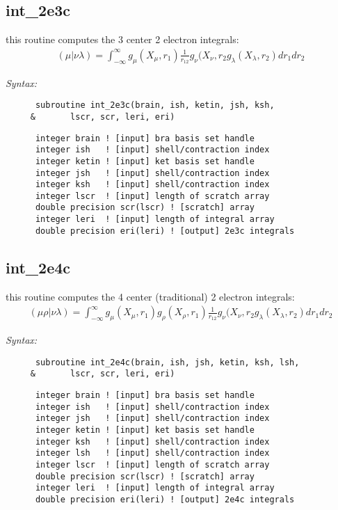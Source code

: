 \subsection{int\_2e3c} 
this routine computes the 3 center 2 electron integrals:  
\begin{eqnarray*} 
({\mu}|{\nu}{\lambda}) = \int_{-\infty}^{\infty} g_{\mu}(X_{\mu},r_{1})\frac{1}{r_{12}} 
g_{\nu}(X_{\nu},r_{2}g_{\lambda}(X_{\lambda},r_{2})dr_{1}dr_{2} 
\end{eqnarray*} 
 
{\it Syntax:} 
\begin{verbatim} 
      subroutine int_2e3c(brain, ish, ketin, jsh, ksh, 
     &       lscr, scr, leri, eri) 
\end{verbatim} 
\begin{verbatim} 
      integer brain ! [input] bra basis set handle 
      integer ish   ! [input] shell/contraction index 
      integer ketin ! [input] ket basis set handle 
      integer jsh   ! [input] shell/contraction index 
      integer ksh   ! [input] shell/contraction index 
      integer lscr  ! [input] length of scratch array 
      double precision scr(lscr) ! [scratch] array 
      integer leri  ! [input] length of integral array 
      double precision eri(leri) ! [output] 2e3c integrals 
\end{verbatim} 
\subsection{int\_2e4c} 
this routine computes the 4 center (traditional) 2 electron integrals:  
\begin{eqnarray*} 
({\mu}{\rho}|{\nu}{\lambda}) = \int_{-\infty}^{\infty} g_{\mu}(X_{\mu},r_{1})g_{\rho}(X_{\rho},r_{1})\frac{1}{r_{12}}g_{\nu}
(X_{\nu},r_{2}g_{\lambda}(X_{\lambda},r_{2})dr_{1}dr_{2} 
\end{eqnarray*} 
 
{\it Syntax:} 
\begin{verbatim} 
      subroutine int_2e4c(brain, ish, jsh, ketin, ksh, lsh, 
     &       lscr, scr, leri, eri) 
\end{verbatim} 
\begin{verbatim} 
      integer brain ! [input] bra basis set handle 
      integer ish   ! [input] shell/contraction index 
      integer jsh   ! [input] shell/contraction index 
      integer ketin ! [input] ket basis set handle 
      integer ksh   ! [input] shell/contraction index 
      integer lsh   ! [input] shell/contraction index 
      integer lscr  ! [input] length of scratch array 
      double precision scr(lscr) ! [scratch] array 
      integer leri  ! [input] length of integral array 
      double precision eri(leri) ! [output] 2e4c integrals 
\end{verbatim} 
